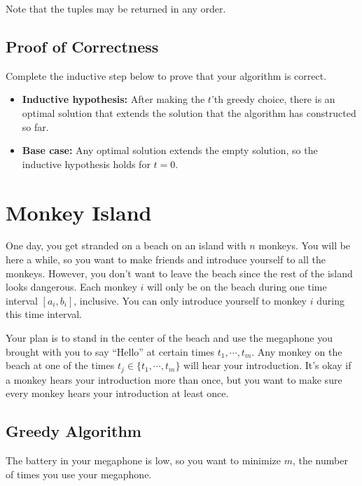 \documentclass [12pt]{article}
\begin{document}
Note that the tuples may be returned in any order. 



\subsection{Proof of Correctness } Complete the inductive step below to prove that your algorithm is correct.

\begin{itemize} 

  \item \textbf{Inductive hypothesis:} After making the $t$'th greedy choice, there is an optimal solution that extends the solution that the algorithm has constructed so far. 
  \item \textbf{Base case:} Any optimal solution extends the empty solution, so the inductive hypothesis holds for $t=0$. 
\end{itemize} 

 
\section{Monkey Island }
\label{sec:last}
One day, you get stranded on a beach on an island with $n$ monkeys. You will be here a while, so you want to make friends and introduce yourself to all the monkeys. However, you don’t want to leave the beach since the rest of the island looks dangerous. Each monkey $i$ will only be on the beach during one time interval $[a_i, b_i]$, inclusive. You can only introduce yourself to monkey $i$ during this time interval. 

Your plan is to stand in the center of the beach and use the megaphone you brought with you to say “Hello” at certain times $t_1,\cdots,t_m$. Any monkey on the beach at one of the times $t_j \in \{t_1,\cdots,t_m\}$ will hear your introduction. It’s okay if a monkey hears your introduction more than once, but you want to make sure every monkey hears your introduction at least once. 

\subsection{Greedy Algorithm } 
The battery in your megaphone is low, so you want to minimize $m$, the number of times you use your megaphone. 
\end{document}
